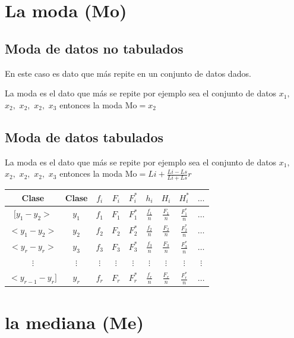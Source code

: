 \documentclass[10pt,]{krantz}
\theoremstyle{definition}
\theoremstyle{definition}
\theoremstyle{definition}
\theoremstyle{remark}
\begin{document}
\hypertarget{la-moda-mo}{%
\section{La moda (Mo)}\label{la-moda-mo}}

\hypertarget{moda-de-datos-no-tabulados}{%
\subsection{Moda de datos no tabulados}\label{moda-de-datos-no-tabulados}}

En este caso es dato que más repite en un conjunto de datos dados.

La moda es el dato que más se repite por ejemplo sea el conjunto de datos \(x_1,\) \(x_2,\) \(x_2,\) \(x_2,\) \(x_3\) entonces la moda \(\text{Mo}=x_2\)

\hypertarget{moda-de-datos-tabulados}{%
\subsection{Moda de datos tabulados}\label{moda-de-datos-tabulados}}

La moda es el dato que más se repite por ejemplo sea el conjunto de datos \(x_1,\) \(x_2,\) \(x_2,\) \(x_2,\) \(x_3\) entonces la moda \(\text{Mo}=Li+\frac{Li-Ls}{Li+Ls}r\)

\begin{longtable}[]{@{}ccccccccc@{}}
\toprule
Clase & Clase & \(f_i\) & \(F_i\) & \(F_i^*\) & \(h_i\) & \(H_i\) & \(H_i^*\) & \(\ldots\)\tabularnewline
\midrule
\endhead
\([y_1-y_2>\) & \(y_1\) & \(f_1\) & \(F_1\) & \(F_1^*\) & \(\frac{f_1}{n}\) & \(\frac{F_1}{n}\) & \(\frac{F_1^*}{n}\) & \(\ldots\)\tabularnewline
\(<y_1-y_2>\) & \(y_2\) & \(f_2\) & \(F_2\) & \(F_2^*\) & \(\frac{f_2}{n}\) & \(\frac{F_2}{n}\) & \(\frac{F_2^*}{n}\) & \(\ldots\)\tabularnewline
\(<y_{r}-y_r>\) & \(y_3\) & \(f_3\) & \(F_3\) & \(F_3^*\) & \(\frac{f_3}{n}\) & \(\frac{F_3}{n}\) & \(\frac{F_3^*}{n}\) & \(\ldots\)\tabularnewline
\(\vdots\) & \(\vdots\) & \(\vdots\) & \(\vdots\) & \(\vdots\) & \(\vdots\) & \(\vdots\) & \(\vdots\) & \(\vdots\)\tabularnewline
\(<y_{r-1}-y_r]\) & \(y_r\) & \(f_r\) & \(F_r\) & \(F_r^*\) & \(\frac{f_r}{n}\) & \(\frac{F_r}{n}\) & \(\frac{F_r^*}{n}\) & \(...\)\tabularnewline
\bottomrule
\end{longtable}

\hypertarget{la-mediana-me}{%
\section{la mediana (Me)}\label{la-mediana-me}}
\end{document}
